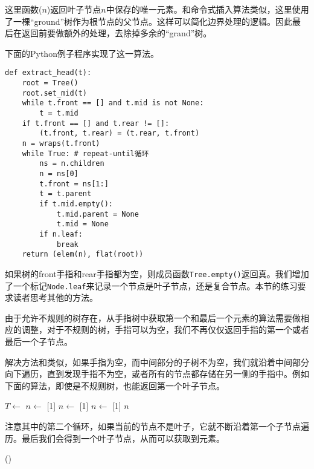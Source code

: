 \documentclass[UTF8]{article}
\begin{document}
这里函数($n$)返回叶子节点$n$中保存的唯一元素。和命令式插入算法类似，这里使用了一棵“ground”树作为根节点的父节点。这样可以简化边界处理的逻辑。因此最后在返回前要做额外的处理，去除掉多余的“grand”树。

下面的Python例子程序实现了这一算法。

\lstset{language=Python}
\begin{lstlisting}
def extract_head(t):
    root = Tree()
    root.set_mid(t)
    while t.front == [] and t.mid is not None:
        t = t.mid
    if t.front == [] and t.rear != []:
        (t.front, t.rear) = (t.rear, t.front)
    n = wraps(t.front)
    while True: # repeat-until循环
        ns = n.children
        n = ns[0]
        t.front = ns[1:]
        t = t.parent
        if t.mid.empty():
            t.mid.parent = None
            t.mid = None
        if n.leaf:
            break
    return (elem(n), flat(root))
\end{lstlisting}

如果树的front手指和rear手指都为空，则成员函数\texttt{Tree.empty()}返回真。我们增加了一个标记\texttt{Node.leaf}来记录一个节点是叶子节点，还是复合节点。本节的练习要求读者思考其他的方法。

由于允许不规则的树存在，从手指树中获取第一个和最后一个元素的算法需要做相应的调整，对于不规则的树，手指可以为空，我们不再仅仅返回手指的第一个或者最后一个子节点。

解决方法和类似，如果手指为空，而中间部分的子树不为空，我们就沿着中间部分向下遍历，直到发现手指不为空，或者所有的节点都存储在另一侧的手指中。例如下面的算法，即使是不规则树，也能返回第一个叶子节点。

\begin{algorithmic}
    \State $T \gets$ 
  \EndWhile
    \State $n \gets$ [1]
  \Else
    \State $n \gets$ [1]
  \EndIf
    \State $n \gets$ [1]
  \EndWhile
  \State \Return $n$
\EndFunction
\end{algorithmic}

注意其中的第二个循环，如果当前的节点不是叶子，它就不断沿着第一个子节点遍历。最后我们会得到一个叶子节点，从而可以获取到元素。

\begin{algorithmic}
  \State \Return {}()
\EndFunction
\end{algorithmic}
\end{document}

